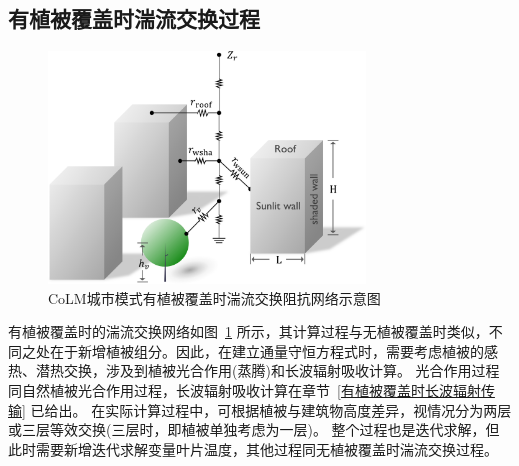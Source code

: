 \subsection{有植被覆盖时湍流交换过程}
{
\begin{figure}[htbp]
\centering
\includegraphics[width=0.75\textwidth]{Figures/城市模式/CoLM城市模式包含植被湍流交换阻抗网络.png}
\caption{CoLM城市模式有植被覆盖时湍流交换阻抗网络示意图}
\label{fig:有植被覆盖时城市湍流交换阻抗示意图}
\end{figure}
}
有植被覆盖时的湍流交换网络如图~\ref{fig:有植被覆盖时城市湍流交换阻抗示意图} 所示，其计算过程与无植被覆盖时类似，不同之处在于新增植被组分。因此，在建立通量守恒方程式时，需要考虑植被的感热、潜热交换，涉及到植被光合作用(蒸腾)和长波辐射吸收计算。
光合作用过程同自然植被光合作用过程，长波辐射吸收计算在章节~\ref{有植被覆盖时长波辐射传输} 已给出。
在实际计算过程中，可根据植被与建筑物高度差异，视情况分为两层或三层等效交换(三层时，即植被单独考虑为一层)。
整个过程也是迭代求解，但此时需要新增迭代求解变量叶片温度，其他过程同无植被覆盖时湍流交换过程。


